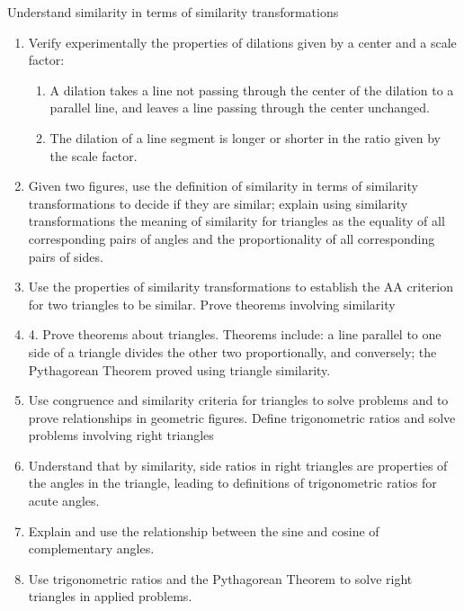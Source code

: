 \documentclass[12pt]{article}
\begin{document}
Understand similarity in terms of similarity transformations\\

\begin{enumerate}


\item Verify experimentally the properties of dilations given by a center and
	a scale factor:

	\begin{enumerate}
		\item A dilation takes a line not passing through the center of the dilation to a parallel line, and leaves a line passing through the center unchanged.\\
		
		\item The dilation of a line segment is longer or shorter in the ratio given by the scale factor.\\
	\end{enumerate}

\item Given two figures, use the definition of similarity in terms of similarity transformations to decide if they are similar; explain using similarity transformations the meaning of similarity for triangles as the equality of all corresponding pairs of angles and the proportionality of all corresponding pairs of sides.\\

\item Use the properties of similarity transformations to establish the AA criterion for two triangles to be similar. Prove theorems involving similarity\\

\item 4. Prove theorems about triangles. Theorems include: a line parallel to one side of a triangle divides the other two proportionally, and conversely; the Pythagorean Theorem proved using triangle similarity.\\

\item  Use congruence and similarity criteria for triangles to solve problems and to prove relationships in geometric figures. Define trigonometric ratios and solve problems involving right triangles\\

\item  Understand that by similarity, side ratios in right triangles are
properties of the angles in the triangle, leading to definitions of trigonometric ratios for acute angles.\\

\item  Explain and use the relationship between the sine and cosine of complementary angles.\\

\item  Use trigonometric ratios and the Pythagorean Theorem to solve right triangles in applied problems.\\

\end{enumerate}
\end{document}
